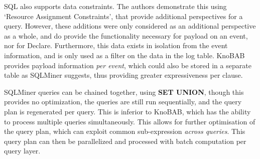 SQL also supports data constraints. The authors demonstrate this using `Resource Assignment Constraints', that provide additional perspectives for a query. However, these additions were only considered as an additional perspective as a whole, and do provide the functionality necessary for payload on an event, nor for Declare. Furthermore, this data exists in isolation from the event information, and is only used as a filter on the data in the log table. KnoBAB provides payload information \emph{per event}, which could also be stored in a separate table as SQLMiner suggests, thus providing greater expressiveness per clause.

SQLMiner queries can be chained together, using {\bf SET UNION}, though this provides no optimization, the queries are still run sequentially, and the query plan is regenerated per query. This is inferior to KnoBAB, which has the ability to process multiple queries simultaneously. This allows for further optimisation of the query plan, which can exploit common sub-expression \emph{across queries}. This query plan can then be parallelized and processed with batch computation per query layer.
